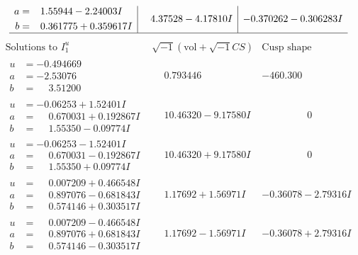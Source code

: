 \documentclass[1p]{elsarticle_modified}
\theoremstyle{definition}
\newcommand{\I}{\sqrt{-1}}
\begin{document}
$$\begin{array}{c|c|c}
\begin{aligned}
a &= \phantom{-}1.55944 - 2.24003 I \\
b &= \phantom{-}0.361775 + 0.359617 I\end{aligned}
 & \phantom{-}4.37528 - 4.17810 I & -0.370262 - 0.306283 I\\
 \hline 
 \end{array}$$\newpage$$\begin{array}{c|c|c}  
\text{Solutions to }I^u_{1}& \I (\text{vol} + \sqrt{-1}CS) & \text{Cusp shape}\\
 \hline 
\begin{aligned}
u &= -0.494669\phantom{ +0.000000I} \\
a &= -2.53076\phantom{ +0.000000I} \\
b &= \phantom{-}3.51200\phantom{ +0.000000I}\end{aligned}
 & \phantom{-}0.793446\phantom{ +0.000000I} & -460.300\phantom{ +0.000000I} \\ \hline\begin{aligned}
u &= -0.06253 + 1.52401 I \\
a &= \phantom{-}0.670031 + 0.192867 I \\
b &= \phantom{-}1.55350 - 0.09774 I\end{aligned}
 & \phantom{-}10.46320 - 9.17580 I & \phantom{-0.000000 } 0 \\ \hline\begin{aligned}
u &= -0.06253 - 1.52401 I \\
a &= \phantom{-}0.670031 - 0.192867 I \\
b &= \phantom{-}1.55350 + 0.09774 I\end{aligned}
 & \phantom{-}10.46320 + 9.17580 I & \phantom{-0.000000 } 0 \\ \hline\begin{aligned}
u &= \phantom{-}0.007209 + 0.466548 I \\
a &= \phantom{-}0.897076 - 0.681843 I \\
b &= \phantom{-}0.574146 + 0.303517 I\end{aligned}
 & \phantom{-}1.17692 + 1.56971 I & -0.36078 - 2.79316 I \\ \hline\begin{aligned}
u &= \phantom{-}0.007209 - 0.466548 I \\
a &= \phantom{-}0.897076 + 0.681843 I \\
b &= \phantom{-}0.574146 - 0.303517 I\end{aligned}
 & \phantom{-}1.17692 - 1.56971 I & -0.36078 + 2.79316 I \\ \hline\begin{aligned}

\end{aligned}
\end{array}$$
\end{document}
